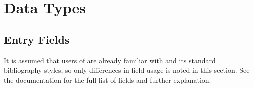 \documentclass{ltxdockit}[2010/02/12]
\begin{document}

\section{Data Types}
\subsection{Entry Fields}
It is assumed that users of  are already familiar with  and its standard bibliography styles, so only differences in field usage is noted in this section. See the  documentation for the full list of fields and further explanation.
\end{document}
